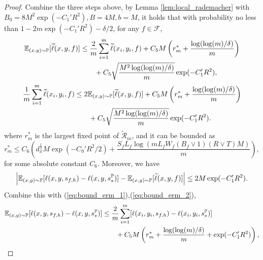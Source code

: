 \documentclass[11pt]{article}
\numberwithin{equation}{section}
\renewcommand{\P}{\mathbb{P}}
\renewcommand{\eqref}[1]{(\ref{#1})}
\begin{document}
\begin{proof}
    Combine the three steps above, by Lemma \ref{lem:local_rademacher} with $B_0=8M^2\exp(-C_1'R^2),B=4M,b=M$, it holds that with probability no less than $1-2m\exp(-C_1'R^2)-\delta/2$, for any $f\in\mathcal{F}$,
    \begin{equation}\label{eq:bound_erm_1}
        \begin{aligned}
            \E_{(x,y)\sim\P} [\widetilde{\ell}(x,y,f)]
            &\leq \frac{2}{m}\sum_{i=1}^m \widetilde{\ell}(x_i,y_i,f) + C_5M\left(r_m^*+\frac{\log(\log(m)/\delta)}{m}\right) \\
            &\qquad + C_5\sqrt{\frac{M^2\log(\log(m)/\delta)}{m}}\exp(-C_1'R^2),
        \end{aligned}
    \end{equation}
    \begin{equation}\label{eq:bound_erm_2}
        \begin{aligned}
            \frac{1}{m}\sum_{i=1}^m \widetilde{\ell}(x_i,y_i,f)
            &\leq 2\E_{(x,y)\sim\P} [\widetilde{\ell}(x,y,f)] + C_5M\left(r_m^*+\frac{\log(\log(m)/\delta)}{m}\right) \\
            &\qquad + C_5\sqrt{\frac{M^2\log(\log(m)/\delta)}{m}}\exp(-C_1'R^2).
        \end{aligned}
    \end{equation}
    where $r_m^*$ is the largest fixed point of $\widetilde{\mathcal{R}}_m$, and it can be bounded as
    \begin{equation}
        r_m^*\leq C_6\left(d_x^{\frac{1}{2}}M\exp(-C_0'R^2/2)+\frac{S_fL_f\log\left(mL_fW_f(B_f\vee 1)(R\vee T)M\right)}{m}\right),
    \end{equation}
    for some absolute constant $C_6$.
    Moreover, we have
    \begin{equation}
        \left|\E_{(x,y)\sim\P}[\ell(x,y,s_{f,h})-\ell(x,y,s_*^\P)]
        - \E_{(x,y)\sim\P}[\widetilde{\ell}(x,y,f)]\right| \leq 2M\exp(-C_1'R^2).
    \end{equation}
    Combine this with \eqref{eq:bound_erm_1},\eqref{eq:bound_erm_2},
    \begin{equation}\label{eq:bound_erm_3}
        \begin{aligned}
            \E_{(x,y)\sim\P} [\ell(x,y,s_{f,h})-\ell(x,y,s_*^\P)]
            &\leq \frac{2}{m}\sum_{i=1}^m [\ell(x_i,y_i,s_{f,h})-\ell(x_i,y_i,s_*^\P)] \\
            &\qquad + C_5M\left(r_m^*+\frac{\log(\log(m)/\delta)}{m}+\exp(-C_1'R^2)\right), \\

\end{aligned}
\end{equation}
\end{proof}
\end{document}
